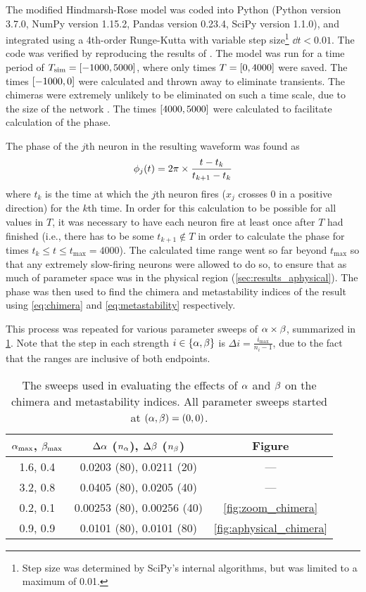 The modified Hindmarsh-Rose model was coded into Python (Python version 3.7.0, NumPy version 1.15.2, Pandas version 0.23.4, SciPy version 1.1.0), and integrated using a 4th-order Runge-Kutta with variable step size\footnote{Step size was determined by SciPy's internal algorithms, but was limited to a maximum of 0.01.} $\dd{t} < 0.01$.
The code was verified by reproducing the results of \cite{Santos2017}.
The model was run for a time period of $T_{\text{sim}} = \bqty{-1000, 5000}$, where only times $T = \bqty{0, 4000}$ were saved.
The times $\bqty{-1000, 0}$ were calculated and thrown away to eliminate transients.
The chimeras were extremely unlikely to be eliminated on such a time scale, due to the size of the network \cite{Wolfrum2011}.
The times $\bqty{4000, 5000}$ were calculated to facilitate calculation of the phase.

The phase of the $j$th neuron in the resulting waveform was found as
\begin{equation}
  \label{eq:hr_phase}
  \phi_{j}(t)
  =
  2 \pi \times \frac{t - t_{k}}{t_{k + 1} - t_{k}}
\end{equation}
where $t_{k}$ is the time at which the $j$th neuron fires ($x_{j}$ crosses 0 in a positive direction) for the $k$th time.
In order for this calculation to be possible for all values in $T$, it was necessary to have each neuron fire at least once after $T$ had finished (i.e., there has to be some $t_{k + 1} \notin T$ in order to calculate the phase for times $t_{k} \leq t \leq t_{\text{max}} = 4000$).
The calculated time range went so far beyond $t_{\text{max}}$ so that any extremely slow-firing neurons were allowed to do so, to ensure that as much of parameter space was in the physical region (\cref{sec:results_aphysical}).
The phase was then used to find the chimera and metastability indices of the result using \cref{eq:chimera} and \cref{eq:metastability} respectively.

This process was repeated for various parameter sweeps of $\alpha \times \beta$, summarized in \cref{tab:parameter_sweeps}.
Note that the step in each strength $i \in \Bqty{\hra, \hrb}$ is $\Delta i = \frac{i_{\text{max}}}{n_{i} - 1}$, due to the fact that the ranges are inclusive of both endpoints.
\begin{table}[ht]
  \centering
  \begin{tabular}{c | c | c}
    $\alpha_{\text{max}}$, $\beta_{\text{max}}$ & $\Delta \alpha$ ($n_{\alpha}$), $\Delta \beta$ ($n_{\beta}$) & Figure \\ \hline
    1.6, 0.4 & 0.0203 (80), 0.0211 (20) & --- \\
    3.2, 0.8 & 0.0405 (80), 0.0205 (40) & --- \\
    0.2, 0.1 & 0.00253 (80), 0.00256 (40) & \cref{fig:zoom_chimera} \\
    0.9, 0.9 & 0.0101 (80), 0.0101 (80) & \cref{fig:aphysical_chimera}
  \end{tabular}
  \caption[Parameter sweeps]{The sweeps used in evaluating the effects of $\alpha$ and $\beta$ on the chimera and metastability indices.
    All parameter sweeps started at $(\alpha, \beta) = (0, 0)$.
  }
  \label{tab:parameter_sweeps}
\end{table}

